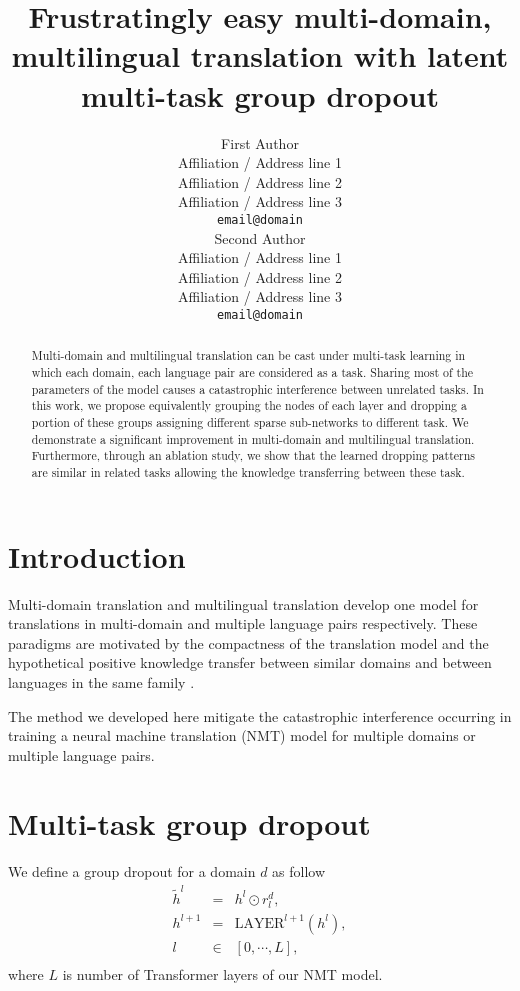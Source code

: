 \documentclass[11pt]{article}
\title{Frustratingly easy multi-domain, multilingual translation with latent multi-task group dropout}
\author{First Author \\
  Affiliation / Address line 1 \\
  Affiliation / Address line 2 \\
  Affiliation / Address line 3 \\
  \texttt{email@domain} \\\And
  Second Author \\
  Affiliation / Address line 1 \\
  Affiliation / Address line 2 \\
  Affiliation / Address line 3 \\
  \texttt{email@domain} \\}
\begin{document}
\maketitle
\begin{abstract}
Multi-domain and multilingual translation can be cast under multi-task learning in which each domain, each language pair are considered as a task. Sharing most of the parameters of the model causes a catastrophic interference between unrelated tasks. In this work, we propose equivalently grouping the nodes of each layer and dropping a portion of these groups assigning different sparse sub-networks to different task. We demonstrate a significant improvement in multi-domain and multilingual translation. Furthermore, through an ablation study, we show that the learned dropping patterns are similar in related tasks allowing the knowledge transferring between these task.
\end{abstract}

\section{Introduction}
Multi-domain translation and multilingual translation develop one model for translations in multi-domain and multiple language pairs respectively. These paradigms are motivated by the compactness of the translation model and the hypothetical positive knowledge transfer between similar domains \citep{Pham21revisiting} and between languages in the same family \citep{Tan19multilingual}. 

The method we developed here mitigate the catastrophic interference occurring in training a neural machine translation (NMT) model for multiple domains or multiple language pairs. 

\section{Multi-task group dropout}
We define a group dropout for a domain $d$ as follow
\begin{equation}
\begin{array}{rcl}
\tilde{h}^l &=& h^l \odot r_l^d ,\\
h^{l+1} &=& \text{LAYER}^{l+1}(h^l) ,\\
l & \in & [0,\cdots,L] ,\\
\end{array}
\end{equation}
where $L$ is number of Transformer layers of our NMT model.
\end{document}
